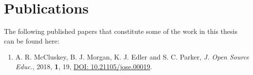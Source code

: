
\chapter{Publications} %

\label{papers} %

The following published papers that constitute some of the work in this thesis can be found here:

\begin{enumerate}
\item A. R. McCluskey, B. J. Morgan, K. J. Edler and S. C. Parker, \emph{J. Open Source Educ.}, 2018, \textbf{1}, 19, \href{https://doi.org/10.21105/jose.00019}{DOI: 10.21105/jose.00019}.
\end{enumerate}

\pagebreak



